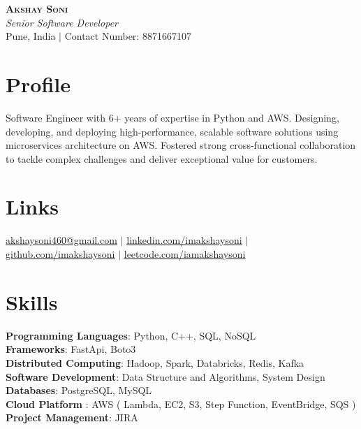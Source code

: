 \documentclass[letterpaper,11pt]{article}
\begin{document}

\begin{center}
    \textbf{\Huge \scshape  Akshay Soni} \\ \vspace{1pt}
    \small \textit{Senior Software Developer } \\
    Pune, India $|$ {Contact Number: 8871667107}
\end{center}

\section*{Profile}
Software Engineer with 6+ years of expertise in Python and AWS. Designing, developing, and deploying high-performance, scalable software solutions using microservices architecture on AWS. Fostered strong cross-functional collaboration to tackle complex challenges and deliver exceptional value for customers. 

\section{Links}
 \small { \href{mailto:akshaysoni460@gmail.com}{\underline{akshaysoni460@gmail.com}} $|$
  \href{https://www.linkedin.com/in/imakshaysoni}{\underline{linkedin.com/imakshaysoni}} $|$
    \href{https://github.com/imakshaysoni}{\underline{github.com/imakshaysoni}} $|$
     \href{https://leetcode.com/iamakshaysoni}{\underline{leetcode.com/iamakshaysoni}} 
    }

\section{Skills}
 \begin{itemize}[leftmargin=0.15in, label={}]
    \small{\item{
     \textbf{Programming Languages}{: Python, C++, SQL, NoSQL} \\
     \textbf{Frameworks}{: FastApi, Boto3} \\   
\textbf{Distributed Computing}{: Hadoop, Spark, Databricks, Redis, Kafka} \\
     \textbf{Software Development}{: Data Structure and Algorithms, System Design} \\  \textbf{Databases}{: PostgreSQL, MySQL} \\\textbf{Cloud Platform }{: AWS ( Lambda, EC2, S3, Step Function, EventBridge, SQS ) }\\
     \textbf{Project Management}{: JIRA}
    }}
 \end{itemize}
\end{document}
